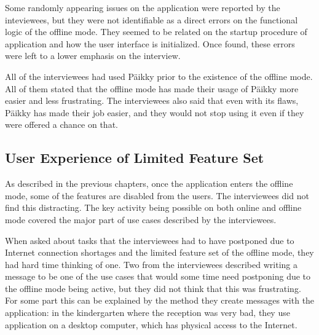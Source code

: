 Some randomly appearing issues on the application were reported by the inteviewees, but they were not identifiable as a direct errors on the functional logic of the offline mode. They seemed to be related on the startup procedure of application and how the user interface is initialized. Once found, these errors were left to a lower emphasis on the interview.

All of the interviewees had used Päikky prior to the existence of the offline mode. All of them stated that the offline mode has made their usage of Päikky more easier and less frustrating. The interviewees also said that even with its flaws, Päikky has made their job easier, and they would not stop using it even if they were offered a chance on that.






\subsection{User Experience of Limited Feature Set}

As described in the previous chapters, once the application enters the offline mode, some of the features are disabled from the users. The interviewees did not find this distracting. The key activity being possible on both online and offline mode covered the major part of use cases described by the interviewees.

When asked about tasks that the interviewees had to have postponed due to Internet connection shortages and the limited feature set of the offline mode, they had hard time thinking of one. Two from the interviewees described writing a message to be one of the use cases that would some time need postponing due to the offline mode being active, but they did not think that this was frustrating. For some part this can be explained by the method they create messages with the application: in the kindergarten where the reception was very bad, they use application on a desktop computer, which has physical access to the Internet.

